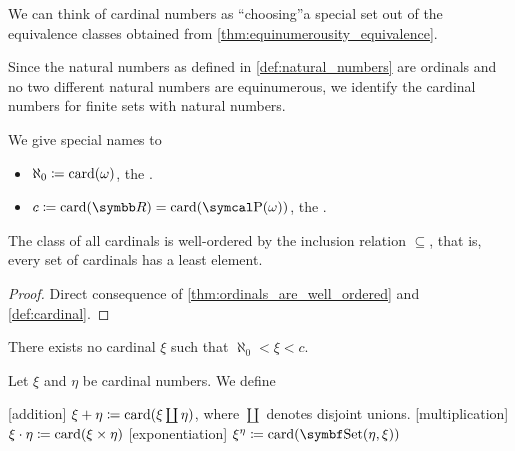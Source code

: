 \begin{remark}\label{remark:cardinals}
  We can think of cardinal numbers as \enquote{choosing}\AOC a special set out of the equivalence classes obtained from \cref{thm:equinumerousity_equivalence}.

  Since the natural numbers as defined in \cref{def:natural_numbers} are ordinals and no two different natural numbers are equinumerous, we identify the cardinal numbers for finite sets with natural numbers.

  We give special names to
  \begin{itemize}
    \item \( \aleph_0 \coloneqq \operatorname{card}(\omega) \), the .
    \item \( c \coloneqq \Card(\R) = \Card(\Power(\omega)) \), the .
  \end{itemize}
\end{remark}

\begin{proposition}\label{thm:cardinals_well_ordered}
  The class of all cardinals is well-ordered by the inclusion relation \( \subseteq \), that is, every set of cardinals has a least element.
\end{proposition}
\begin{proof}
  Direct consequence of \cref{thm:ordinals_are_well_ordered} and \cref{def:cardinal}.
\end{proof}

\begin{hypothesis}\label{hyp:continuum_hypothesis}
  There exists no cardinal \( \xi \) such that \( \aleph_0 < \xi < c \).
\end{hypothesis}

\begin{definition}\label{def:cardinal_arithmetic}
  Let \( \xi \) and \( \eta \) be cardinal numbers. We define
  \begin{description}
    [addition] \( \xi + \eta \coloneqq \operatorname{card}(\xi \coprod \eta) \), where \( \coprod \) denotes disjoint unions.
    [multiplication] \( \xi \cdot \eta \coloneqq \operatorname{card}(\xi \times \eta) \)
    [exponentiation] \( \xi^\eta \coloneqq \Card(\Cat{Set}(\eta, \xi)) \)
  \end{description}
\end{definition}
